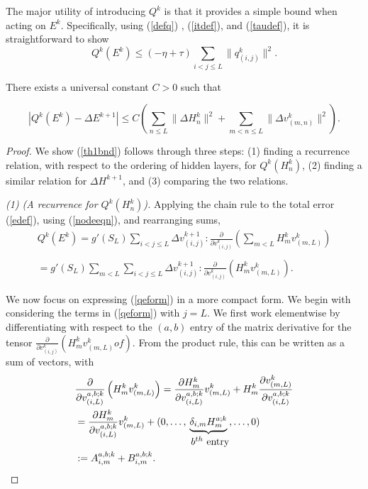 \documentclass{jcmlatex}
\begin{document}
The major utility of introducing $Q^k$ is that it provides a simple bound
when acting on $E^k$.  Specifically, using (\ref{defq}) , (\ref{itdef}),
and (\ref{taudef}), it is straightforward to show
\begin{equation}
Q^k(E^k)\le (-\eta+\tau)\sum_{i<j \le L}\|q_{(i,j)} ^k\|^2. \label{midest}
\end{equation}\begin{theorem}\label{bigtheo}

There exists a universal constant $C>0$ such that

\begin{equation}
|Q^k(E^k)-\Delta E^{k+1}| \le C\left(\sum_{n\le L}\|\Delta H_n^k\|^2 + \sum_{m<n\le
L}\|\Delta v_{(m,n)}^k\|^2\right). \label{th1bnd}
\end{equation}
\end{theorem}\begin{proof} We show (\ref{th1bnd}) follows through three steps: (1) finding a recurrence relation, with respect to the ordering of hidden layers, for $Q^k(H^k_n)$, (2) finding a similar relation for $\Delta H^{k+1}$, and (3) comparing the two relations.

 \textit{(1) (A recurrence for $Q^k(H_n^k)$).} Applying the  chain rule to the total error (\ref{edef}), using (\ref{nodeeqn}),
 and rearranging sums, \begin{align}\label{crule1}
Q^k(E^{k}) = g'(S_L)\sum_{i<j\le L} \Delta v_{(i,j)}^{k+1}:
\frac{\partial }{\partial v_{(i,j)}^k}\left(\sum_{m<L}H_m^{k}v_{(m,L)}^k
 \right)\\\\  =   g'(S_L)\sum_{m<L}\sum_{i<j\le L} \Delta v_{(i,j)}^{k+1}:
\frac{\partial }{\partial v_{(i,j)}^k}\left(H_m^{k}v_{(m,L)}^k \right) \label{qeform}.
\end{align}

We now focus on expressing (\ref{qeform}) in a more compact form. We begin with considering the terms in (\ref{qeform}) with $j = L$. We first work elementwise by differentiating with respect to  the $(a,b)$ entry of the matrix derivative for the tensor $\frac{\partial }{\partial v_{(i,j)}^k}\left(H_m^{k}v_{(m,L)}^k of \right)$. From the product rule,  this can be written as a sum of vectors, with
\begin{align} \label{msplit}
&\frac{\partial }{\partial v_{(i,L)}^{a,b;k}}\left( H_m^{k}v_{(m,L)}^k \right)
= \frac{\partial  H_m^{k} }{\partial v_{(i,L)}^{a,b;k}}v_{(m,L)}^k + H_m^{k}
\frac{\partial v_{(m,L)}^k }{\partial v_{(i,L)}^{a,b;k}}\\
  &=  \frac{\partial  H_m^{k} }{\partial v_{(i,L)}^{a,b;k}}v_{(m,L)}^k +
(0, \dots,\underbrace{ \delta_{i,m}H_m^{a;k}}_{\hbox{ $b^{th}$ entry}}, \dots,
0)\\
&:=A_{i,m}^{a,b;k}+B_{i,m}^{a,b;k}.  \label{msplit2}
\end{align}


\end{proof}
\end{document}
